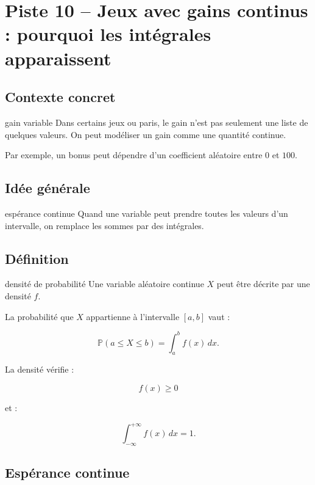 \documentclass[11pt,a4paper]{article}
\newcommand{\Prob}{\mathbb{P}}
\begin{document}
\section{Piste 10 -- Jeux avec gains continus : pourquoi les intégrales apparaissent}

\subsection{Contexte concret}

\begin{contexte}{gain variable}
Dans certains jeux ou paris, le gain n'est pas seulement une liste de quelques valeurs. On peut modéliser un gain comme une quantité continue.

Par exemple, un bonus peut dépendre d'un coefficient aléatoire entre $0$ et $100$.
\end{contexte}

\subsection{Idée générale}

\begin{idee}{espérance continue}
Quand une variable peut prendre toutes les valeurs d'un intervalle, on remplace les sommes par des intégrales.
\end{idee}

\subsection{Définition}

\begin{definitionbox}{densité de probabilité}
Une variable aléatoire continue $X$ peut être décrite par une densité $f$.

La probabilité que $X$ appartienne à l'intervalle $[a,b]$ vaut :

\[
\Prob(a\leq X\leq b)=\int_a^b f(x)\,dx.
\]

La densité vérifie :

\[
f(x)\geq 0
\]

et :

\[
\int_{-\infty}^{+\infty}f(x)\,dx=1.
\]
\end{definitionbox}

\subsection{Espérance continue}
\end{document}

